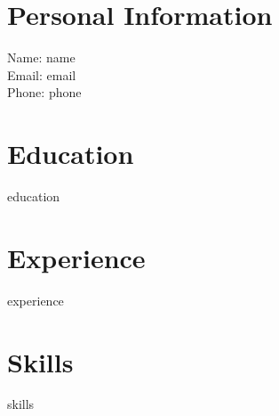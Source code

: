 \documentclass{article}
\begin{document}
\section*{Personal Information}
Name: {{ name }} \\
Email: {{ email }} \\
Phone: {{ phone }} \\

\section*{Education}
{{ education }}

\section*{Experience}
{{ experience }}

\section*{Skills}
{{ skills }}
\end{document}
